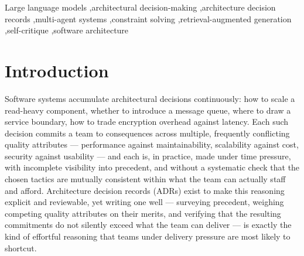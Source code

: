 \documentclass[preprint,12pt,authoryear]{elsarticle}
\renewcommand{\_}{\textunderscore\allowbreak{}}
\begin{document}
\begin{frontmatter}
\begin{abstract}
across all systems; we argue this is an asymmetry, not a quality gap, with implications for evaluating structured multi-stage LLM pipelines generally. Beyond our own re-implemented baselines, we locate our exact held-out items within a public replication package's real, published generations from four frontier models and compare directly against them, giving an external reference point our baselines alone cannot provide.
\end{abstract}

\begin{keyword}
Large language models \sep architectural decision-making \sep architecture decision records \sep multi-agent systems \sep constraint solving \sep retrieval-augmented generation \sep self-critique \sep software architecture
\end{keyword}

\end{frontmatter}

\linenumbers

\section{Introduction}

Software systems accumulate architectural decisions continuously: how to scale a read-heavy component, whether to introduce a message queue, where to draw a service boundary, how to trade encryption overhead against latency. Each such decision commits a team to consequences across multiple, frequently conflicting quality attributes --- performance against maintainability, scalability against cost, security against usability --- and each is, in practice, made under time pressure, with incomplete visibility into precedent, and without a systematic check that the chosen tactics are mutually consistent within what the team can actually staff and afford. Architecture decision records (ADRs) exist to make this reasoning explicit and reviewable, yet writing one well --- surveying precedent, weighing competing quality attributes on their merits, and verifying that the resulting commitments do not silently exceed what the team can deliver --- is exactly the kind of effortful reasoning that teams under delivery pressure are most likely to shortcut.
\end{document}
